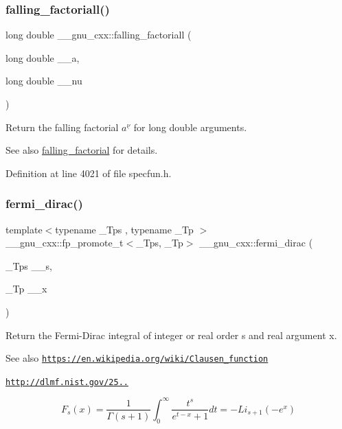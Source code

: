 \subsubsection{\texorpdfstring{falling\+\_\+factoriall()}{falling\_factoriall()}}
{\footnotesize\ttfamily long double \+\_\+\+\_\+gnu\+\_\+cxx\+::falling\+\_\+factoriall (\begin{DoxyParamCaption}\item[{long double}]{\+\_\+\+\_\+a,  }\item[{long double}]{\+\_\+\+\_\+nu }\end{DoxyParamCaption})\hspace{0.3cm}{\ttfamily [inline]}}

Return the falling factorial $ a^{\underline{\nu}} $ for {\ttfamily  long double } arguments.

\begin{DoxySeeAlso}{See also}
\hyperlink{group__gnu__math__spec__func_ga3cc8eb6068c7155ec48b40e20160c5c0}{falling\+\_\+factorial} for details. 
\end{DoxySeeAlso}


Definition at line 4021 of file specfun.\+h.

\mbox{\label{group__gnu__math__spec__func_ga5468fbaed5cb8384cff7cfb9d2188d1a}} 
\subsubsection{\texorpdfstring{fermi\+\_\+dirac()}{fermi\_dirac()}}
{\footnotesize\ttfamily template$<$typename \+\_\+\+Tps , typename \+\_\+\+Tp $>$ \\
\+\_\+\+\_\+gnu\+\_\+cxx\+::fp\+\_\+promote\+\_\+t$<$\+\_\+\+Tps, \+\_\+\+Tp$>$ \+\_\+\+\_\+gnu\+\_\+cxx\+::fermi\+\_\+dirac (\begin{DoxyParamCaption}\item[{\+\_\+\+Tps}]{\+\_\+\+\_\+s,  }\item[{\+\_\+\+Tp}]{\+\_\+\+\_\+x }\end{DoxyParamCaption})\hspace{0.3cm}{\ttfamily [inline]}}

Return the Fermi-\/\+Dirac integral of integer or real order s and real argument x. \begin{DoxySeeAlso}{See also}
\href{https://en.wikipedia.org/wiki/Clausen_function}{\tt https\+://en.\+wikipedia.\+org/wiki/\+Clausen\+\_\+function} 

\href{http://dlmf.nist.gov/25.12.16}{\tt http\+://dlmf.\+nist.\+gov/25..}
\end{DoxySeeAlso}
\[ F_s(x) = \frac{1}{\Gamma(s+1)}\int_0^\infty \frac{t^s}{e^{t-x} + 1}dt = -Li_{s+1}(-e^x) \]


